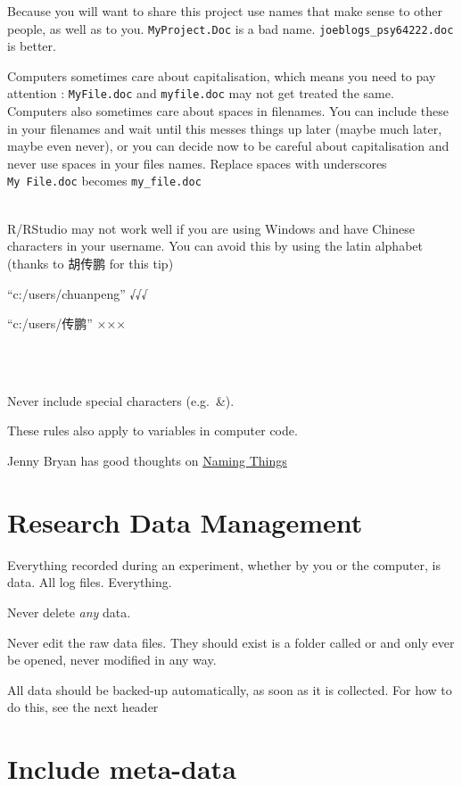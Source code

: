 \documentclass[
]{book}
\newenvironment{info}
    {
    \hline\\
    }
    { 
    \\\\\hline
    }
\begin{document}
Because you will want to share this project use names that make sense to other people, as well as to you. \texttt{MyProject.Doc} is a bad name. \texttt{joeblogs\_psy64222.doc} is better.

Computers sometimes care about capitalisation, which means you need to pay attention : \texttt{MyFile.doc} and \texttt{myfile.doc} may not get treated the same. Computers also sometimes care about spaces in filenames. You can include these in your filenames and wait until this messes things up later (maybe much later, maybe even never), or you can decide now to be careful about capitalisation and never use spaces in your files names. Replace spaces with underscores \texttt{My\ File.doc} becomes \texttt{my\_file.doc}

\begin{info}
R/RStudio may not work well if you are using Windows and have Chinese
characters in your username. You can avoid this by using the latin
alphabet (thanks to 胡传鹏 for this tip)

``c:/users/chuanpeng'' √√√

``c:/users/传鹏'' ×××
\end{info}

Never include special characters (e.g.~\&).

These rules also apply to variables in computer code.

Jenny Bryan has good thoughts on \href{http://www2.stat.duke.edu/~rcs46/lectures_2015/01-markdown-git/slides/naming-slides/naming-slides.pdf}{Naming Things}

\hypertarget{research-data-management}{%
\section{Research Data Management}\label{research-data-management}}

Everything recorded during an experiment, whether by you or the computer, is data. All log files. Everything.

Never delete \emph{any} data.

Never edit the raw data files. They should exist is a folder called \raw or \data and only ever be opened, never modified in any way.

All data should be backed-up automatically, as soon as it is collected. For how to do this, see the next header

\hypertarget{include-meta-data}{%
\section{Include meta-data}\label{include-meta-data}}
\end{document}
